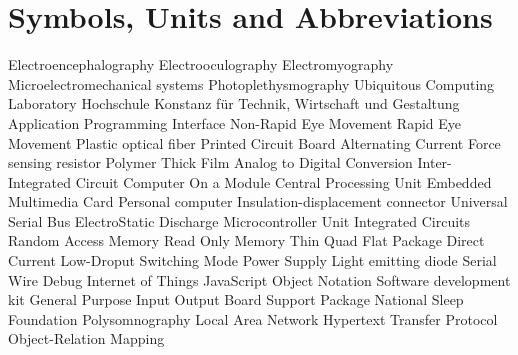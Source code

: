\chapter*{Symbols, Units and Abbreviations}

\begin{acronym}
   {Electroencephalography}
   {Electrooculography}
   {Electromyography}
   {Microelectromechanical systems}
   {Photoplethysmography}
   {Ubiquitous Computing Laboratory}
   {Hochschule Konstanz f\"ur Technik, Wirtschaft und Gestaltung}
   {Application Programming Interface}
   {Non-Rapid Eye Movement}
   {Rapid Eye Movement}
   {Plastic optical fiber}
   {Printed Circuit Board}
   {Alternating Current}
   {Force sensing resistor}
   {Polymer Thick Film}
   {Analog to Digital Conversion}
   {Inter-Integrated Circuit}
   {Computer On a Module}
   {Central Processing Unit}
   {Embedded Multimedia Card}
   {Personal computer}
   {Insulation-displacement connector}
   {Universal Serial Bus}
   {ElectroStatic Discharge}
   {Microcontroller Unit}
   {Integrated Circuits}
   {Random Access Memory}
   {Read Only Memory}
   {Thin Quad Flat Package}
   {Direct Current}
   {Low-Droput}
   {Switching Mode Power Supply}
   {Light emitting diode}
   {Serial Wire Debug}
   {Internet of Things}
   {JavaScript Object Notation}
   {Software development kit}
   {General Purpose Input Output}
   {Board Support Package}
   {National Sleep Foundation}
   {Polysomnography}
   {Local Area Network}
   {Hypertext Transfer Protocol}
   {Object-Relation Mapping}
\end{acronym}

\newpage